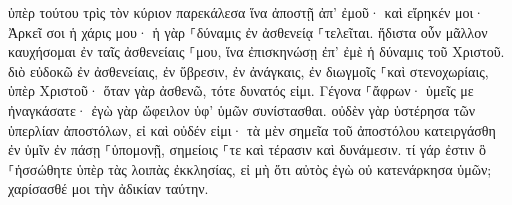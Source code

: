\documentclass{openreader}
\begin{document}
ὑπὲρ τούτου τρὶς τὸν κύριον παρεκάλεσα ἵνα ἀποστῇ ἀπ’ ἐμοῦ· 
καὶ εἴρηκέν μοι· Ἀρκεῖ σοι ἡ χάρις μου· ἡ γὰρ ⸀δύναμις ἐν ἀσθενείᾳ ⸀τελεῖται. ἥδιστα οὖν μᾶλλον καυχήσομαι ἐν ταῖς ἀσθενείαις ⸀μου, ἵνα ἐπισκηνώσῃ ἐπ’ ἐμὲ ἡ δύναμις τοῦ Χριστοῦ. 
διὸ εὐδοκῶ ἐν ἀσθενείαις, ἐν ὕβρεσιν, ἐν ἀνάγκαις, ἐν διωγμοῖς ⸀καὶ στενοχωρίαις, ὑπὲρ Χριστοῦ· ὅταν γὰρ ἀσθενῶ, τότε δυνατός εἰμι. 
Γέγονα ⸀ἄφρων· ὑμεῖς με ἠναγκάσατε· ἐγὼ γὰρ ὤφειλον ὑφ’ ὑμῶν συνίστασθαι. οὐδὲν γὰρ ὑστέρησα τῶν ὑπερλίαν ἀποστόλων, εἰ καὶ οὐδέν εἰμι· 
τὰ μὲν σημεῖα τοῦ ἀποστόλου κατειργάσθη ἐν ὑμῖν ἐν πάσῃ ⸀ὑπομονῇ, σημείοις ⸀τε καὶ τέρασιν καὶ δυνάμεσιν. 
τί γάρ ἐστιν ὃ ⸀ἡσσώθητε ὑπὲρ τὰς λοιπὰς ἐκκλησίας, εἰ μὴ ὅτι αὐτὸς ἐγὼ οὐ κατενάρκησα ὑμῶν; χαρίσασθέ μοι τὴν ἀδικίαν ταύτην. 
\end{document}

